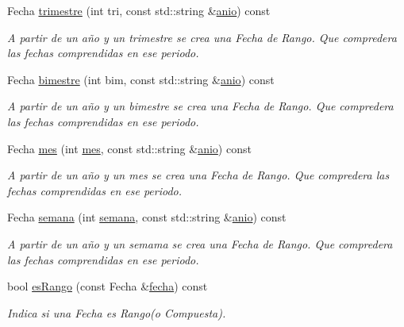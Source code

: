 \begin{DoxyCompactItemize}
\-Fecha \hyperlink{classM__Fechas_a26b592cebfd7ac3a1965937961bbe731}{trimestre} (int tri, const std\-::string \&\hyperlink{classM__Fechas_a833db0292ef2aae8764fb1e4d397dbfb}{anio}) const 
\begin{DoxyCompactList}\small\item\em \-A partir de un año y un trimestre se crea una \-Fecha de \-Rango. \-Que compredera las fechas comprendidas en ese periodo. \end{DoxyCompactList}\item 
\-Fecha \hyperlink{classM__Fechas_ae22a1174bdcacf0fd15c1a437e85b701}{bimestre} (int bim, const std\-::string \&\hyperlink{classM__Fechas_a833db0292ef2aae8764fb1e4d397dbfb}{anio}) const 
\begin{DoxyCompactList}\small\item\em \-A partir de un año y un bimestre se crea una \-Fecha de \-Rango. \-Que compredera las fechas comprendidas en ese periodo. \end{DoxyCompactList}\item 
\-Fecha \hyperlink{classM__Fechas_ae6ad20c72a5f70a334613da72459c006}{mes} (int \hyperlink{classM__Fechas_ae6ad20c72a5f70a334613da72459c006}{mes}, const std\-::string \&\hyperlink{classM__Fechas_a833db0292ef2aae8764fb1e4d397dbfb}{anio}) const 
\begin{DoxyCompactList}\small\item\em \-A partir de un año y un mes se crea una \-Fecha de \-Rango. \-Que compredera las fechas comprendidas en ese periodo. \end{DoxyCompactList}\item 
\-Fecha \hyperlink{classM__Fechas_a32fe27a2628bce51a3762ce8bc3e03b2}{semana} (int \hyperlink{classM__Fechas_a32fe27a2628bce51a3762ce8bc3e03b2}{semana}, const std\-::string \&\hyperlink{classM__Fechas_a833db0292ef2aae8764fb1e4d397dbfb}{anio}) const 
\begin{DoxyCompactList}\small\item\em \-A partir de un año y un semama se crea una \-Fecha de \-Rango. \-Que compredera las fechas comprendidas en ese periodo. \end{DoxyCompactList}\item 
bool \hyperlink{classM__Fechas_af24fa241e5423b0e7afbb8843fba4e64}{es\-Rango} (const \-Fecha \&\hyperlink{classM__Fechas_a9ab0eddea3638aba66d48215c216d91e}{fecha}) const 
\begin{DoxyCompactList}\small\item\em \-Indica si una \-Fecha es \-Rango(o Compuesta). \end{DoxyCompactList}\item 

\end{DoxyCompactItemize}
